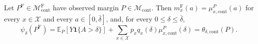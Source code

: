 Let \(P^{\mathrm F}\in\mathcal M_{\mathrm{cont}}^{\mathrm F}\) have observed margin \(P\in\mathcal M_{\mathrm{cont}}\).  Then \(m_x^{\mathrm F}(a)=\mu_{x,\mathrm{cont}}^P(a)\) for every \(x\in\mathcal X\) and every \(a\in[0,\bar\delta]\), and, for every \(0\leq\delta\leq\bar\delta\),
\[
 \psi_\delta(P^{\mathrm F})
 =\mathbb E_P[Y\mathbf 1\{A>\delta\}]
 +\sum_{x\in\mathcal X}p_xq_x(\delta)\mu_{x,\mathrm{cont}}^P(\delta)
 =\theta_{\delta,\mathrm{cont}}(P).
\]